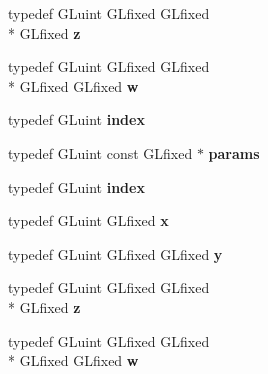 \begin{DoxyCompactItemize}
\item 
\hypertarget{class_c_p_v_r_tgles_ext_ac17d062e41dbd4c719508e077c523e65}{typedef G\+Luint G\+Lfixed G\+Lfixed \\*
G\+Lfixed {\bfseries z}}\label{class_c_p_v_r_tgles_ext_ac17d062e41dbd4c719508e077c523e65}

\item 
\hypertarget{class_c_p_v_r_tgles_ext_a16e6718fe0377c7917e1a158f42511f2}{typedef G\+Luint G\+Lfixed G\+Lfixed \\*
G\+Lfixed G\+Lfixed {\bfseries w}}\label{class_c_p_v_r_tgles_ext_a16e6718fe0377c7917e1a158f42511f2}

\item 
\hypertarget{class_c_p_v_r_tgles_ext_a8c371b922a8940951930ac226e844106}{typedef G\+Luint {\bfseries index}}\label{class_c_p_v_r_tgles_ext_a8c371b922a8940951930ac226e844106}

\item 
\hypertarget{class_c_p_v_r_tgles_ext_a48d6cb0d5b002f158ef51aa7820eea2f}{typedef G\+Luint const G\+Lfixed $\ast$ {\bfseries params}}\label{class_c_p_v_r_tgles_ext_a48d6cb0d5b002f158ef51aa7820eea2f}

\item 
\hypertarget{class_c_p_v_r_tgles_ext_a8c371b922a8940951930ac226e844106}{typedef G\+Luint {\bfseries index}}\label{class_c_p_v_r_tgles_ext_a8c371b922a8940951930ac226e844106}

\item 
\hypertarget{class_c_p_v_r_tgles_ext_a2d14aa1d3113e6acf0c537f1eae373de}{typedef G\+Luint G\+Lfixed {\bfseries x}}\label{class_c_p_v_r_tgles_ext_a2d14aa1d3113e6acf0c537f1eae373de}

\item 
\hypertarget{class_c_p_v_r_tgles_ext_a50ad84394f2c9ea9eeaa5e048ce3c3e5}{typedef G\+Luint G\+Lfixed G\+Lfixed {\bfseries y}}\label{class_c_p_v_r_tgles_ext_a50ad84394f2c9ea9eeaa5e048ce3c3e5}

\item 
\hypertarget{class_c_p_v_r_tgles_ext_ac17d062e41dbd4c719508e077c523e65}{typedef G\+Luint G\+Lfixed G\+Lfixed \\*
G\+Lfixed {\bfseries z}}\label{class_c_p_v_r_tgles_ext_ac17d062e41dbd4c719508e077c523e65}

\item 
\hypertarget{class_c_p_v_r_tgles_ext_a16e6718fe0377c7917e1a158f42511f2}{typedef G\+Luint G\+Lfixed G\+Lfixed \\*
G\+Lfixed G\+Lfixed {\bfseries w}}\label{class_c_p_v_r_tgles_ext_a16e6718fe0377c7917e1a158f42511f2}


\end{DoxyCompactItemize}
